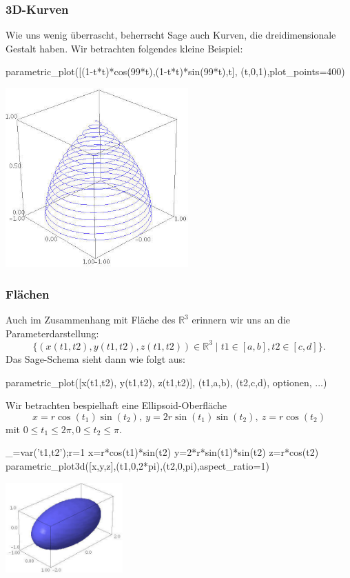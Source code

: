 \documentclass[fontsize=12pt,paper=a4,twoside,bibtotoc,idxtotoc,
liststotoc,pagesize,BCOR1.2cm,DIV15,chapterprefix,pagesize=pdftex]{scrbook}
\theoremstyle{plain}
\theoremstyle{definition}
\theoremstyle{remark}
\begin{document}
\subsubsection{3D-Kurven}
Wie uns wenig überrascht, beherrscht Sage auch Kurven, die dreidimensionale Gestalt haben. Wir betrachten folgendes kleine Beispiel:
\begin{sagein}
parametric_plot([(1-t*t)*cos(99*t),(1-t*t)*sin(99*t),t], (t,0,1),plot_points=400)
\end{sagein}
\begin{center}
\includegraphics[width=7cm]{parametric3d.jpg} 
\end{center}

\subsubsection{Flächen}
Auch im Zusammenhang mit Fläche des $\mathbb{R}^3$ erinnern wir uns an die Parameterdarstellung:
\[
 \{(x(t1,t2),y(t1,t2),z(t1,t2)) \in \mathbb{R}^3 \;|\; t1 \in [a,b], t2 \in [c,d] \}.
\]
Das Sage-Schema sieht dann wie folgt aus:
\begin{sagein}
parametric_plot([x(t1,t2), y(t1,t2), z(t1,t2)], (t1,a,b), (t2,c,d), optionen, ...)
\end{sagein}

Wir betrachten bespielhaft eine Ellipsoid-Oberfläche
\[ 
x=r \cos(t_1) \sin(t_2), \ y=2r \sin (t_1) \sin (t_2),\ z =r \cos(t_2) 
\]
 mit $0 \leq t_1 \leq 2 \pi, 0 \leq t_2 \leq \pi.$ 
\begin{sagein}
_=var('t1,t2');r=1
x=r*cos(t1)*sin(t2)
y=2*r*sin(t1)*sin(t2)
z=r*cos(t2)
parametric_plot3d([x,y,z],(t1,0,2*pi),(t2,0,pi),aspect_ratio=1)
\end{sagein}
\begin{center}
\includegraphics[width=4.5cm]{surface.jpg} 
\end{center}
\end{document}
